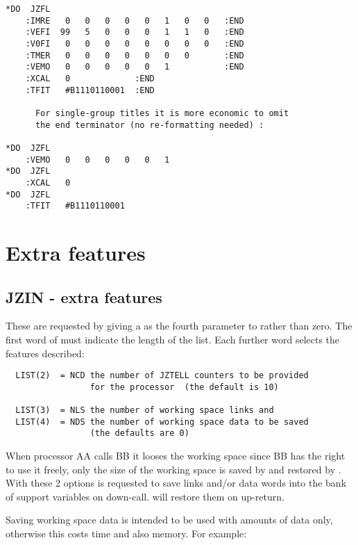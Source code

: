 \begin{verbatim}
*DO  JZFL
    :IMRE   0   0   0   0   0   1   0   0   :END
    :VEFI  99   5   0   0   0   1   1   0   :END
    :V0FI   0   0   0   0   0   0   0   0   :END
    :TMER   0   0   0   0   0   0   0       :END
    :VEMO   0   0   0   0   0   1           :END
    :XCAL   0             :END
    :TFIT   #B1110110001  :END

      For single-group titles it is more economic to omit
      the end terminator (no re-formatting needed) :

*DO  JZFL
    :VEMO   0   0   0   0   0   1
*DO  JZFL
    :XCAL   0
*DO  JZFL
    :TFIT   #B1110110001

\end{verbatim} 

\chapter{Extra features}

\section{JZIN - extra features}
\label{sec:JZextraJZIN}

These are requested by giving a  as the fourth parameter
to  rather than zero.
The first word of  must indicate the length of the list.
Each further word selects the features described:

\begin{verbatim}
  LIST(2)  = NCD the number of JZTELL counters to be provided
                 for the processor  (the default is 10)

  LIST(3)  = NLS the number of working space links and
  LIST(4)  = NDS the number of working space data to be saved
                 (the defaults are 0)
\end{verbatim} 

When processor AA calls BB it looses the working space
since BB has the right to use it freely,
only the size of the working space is saved by  and
restored by .
With these 2 options  is requested to save links 
and/or data words  into the bank of support variables
on down-call.
 will restore them on up-return.

Saving working space data is intended to be used with
 amounts of data only,
otherwise this costs time and also memory.
For example:

